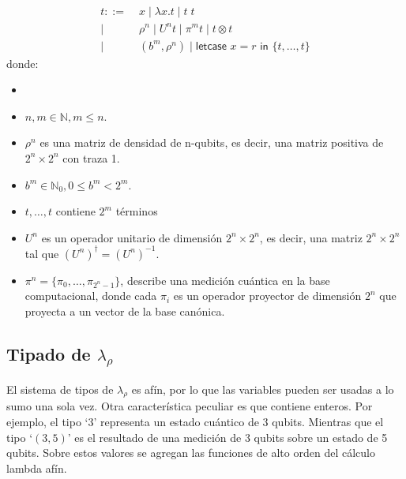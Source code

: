\begin{definicion}
\label{lambda_rho_def}
\begin{align*}
t ::= &\;x \mid \lambda x.t \mid t\;t \tag{Lambda cálculo estándar}\\
 \mid&\; \rho^n \mid U^n t \mid \pi^m t \mid t \otimes t \tag{Postulados cuánticos}\\
 \mid&\; (b^m, \rho^n) \mid \textsf{letcase }x = r \textsf{ in } \{t,\dots,t\} \tag{Control clásico}
\end{align*}
donde:
\begin{itemize}
    \item
    \item $n,m \in \mathbb{N}, m \leq n$.
    \item $\rho^n$ es una matriz de densidad de n-qubits, es decir, una matriz positiva de $2^n \times 2^n$ con traza 1.
    \item $b^m \in \mathbb{N}_0, 0 \leq b^m < 2^m$.
    \item ${t,\dots,t}$ contiene $2^m$ términos
    \item $U^n$ es un operador unitario de dimensión $2^n \times 2^n$, es decir, una matriz $2^n \times 2^n$ tal que $(U^n)^\dagger = (U^n)^{-1}$.
    \item $\pi^n=\{\pi_0,\dots,\pi_{2^n-1}\}$, describe una medición cuántica en la base computacional, donde cada $\pi_i$ es un operador proyector de dimensión $2^n$ que proyecta a un vector de la base canónica.
\end{itemize}
\end{definicion}


\subsection{\texorpdfstring{Tipado de $\lambda_\rho$}{Tipado de Lambda Rho}}
El sistema de tipos de $\lambda_\rho$ es afín, por lo que las variables pueden ser usadas a lo sumo una sola vez. Otra característica peculiar es que contiene enteros. Por ejemplo, el tipo `3' representa un estado cuántico de 3 qubits. Mientras que el tipo `$(3, 5)$' es el resultado de una medición de 3 qubits sobre un estado de 5 qubits. Sobre estos valores se agregan las funciones de alto orden del cálculo lambda afín.

